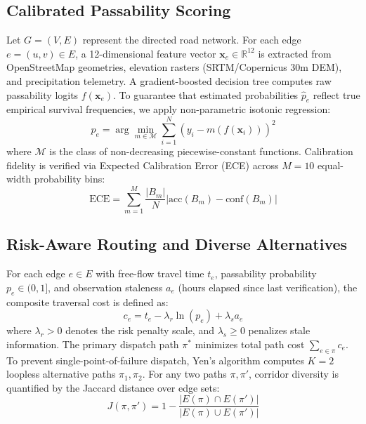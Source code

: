 \documentclass[11pt,a4paper]{article}
\begin{document}
\subsection{Calibrated Passability Scoring}
Let $G = (V, E)$ represent the directed road network. For each edge $e = (u, v) \in E$, a 12-dimensional feature vector $\mathbf{x}_e \in \mathbb{R}^{12}$ is extracted from OpenStreetMap geometries, elevation rasters (SRTM/Copernicus 30m DEM), and precipitation telemetry. A gradient-boosted decision tree computes raw passability logits $f(\mathbf{x}_e)$. To guarantee that estimated probabilities $\hat{p}_e$ reflect true empirical survival frequencies, we apply non-parametric isotonic regression:
\begin{equation}
    p_e = \arg\min_{m \in \mathcal{M}} \sum_{i=1}^N \left( y_i - m(f(\mathbf{x}_i)) \right)^2
\end{equation}
where $\mathcal{M}$ is the class of non-decreasing piecewise-constant functions. Calibration fidelity is verified via Expected Calibration Error (ECE) across $M=10$ equal-width probability bins:
\begin{equation}
    \text{ECE} = \sum_{m=1}^M \frac{|B_m|}{N} \left| \text{acc}(B_m) - \text{conf}(B_m) \right|
\end{equation}

\subsection{Risk-Aware Routing and Diverse Alternatives}
For each edge $e \in E$ with free-flow travel time $t_e$, passability probability $p_e \in (0, 1]$, and observation staleness $a_e$ (hours elapsed since last verification), the composite traversal cost is defined as:
\begin{equation}
    c_e = t_e - \lambda_r \ln(p_e) + \lambda_s a_e
\end{equation}
where $\lambda_r > 0$ denotes the risk penalty scale, and $\lambda_s \ge 0$ penalizes stale information. The primary dispatch path $\pi^*$ minimizes total path cost $\sum_{e \in \pi} c_e$. 
To prevent single-point-of-failure dispatch, Yen's algorithm computes $K=2$ loopless alternative paths $\pi_1, \pi_2$. For any two paths $\pi, \pi'$, corridor diversity is quantified by the Jaccard distance over edge sets:
\begin{equation}
    J(\pi, \pi') = 1 - \frac{|E(\pi) \cap E(\pi')|}{|E(\pi) \cup E(\pi')|}
\end{equation}
\end{document}
